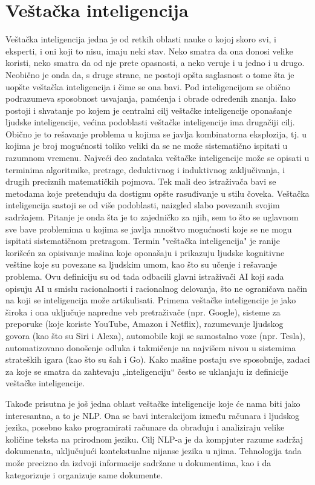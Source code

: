 \documentclass[a4paper]{article}
\begin{document}
\section{Veštačka inteligencija}
\label{Veštačka inteligencija}
Veštačka inteligencija jedna je od retkih oblasti nauke o kojoj skoro svi, i eksperti, i oni koji to nisu, imaju neki stav. Neko smatra da ona donosi velike koristi, neko smatra da od nje prete opasnosti, a neko veruje i u jedno i u drugo. Neobično je onda da, s druge strane, ne postoji opšta saglasnost o tome šta je uopšte veštačka inteligencija i čime se ona bavi. Pod inteligencijom se obično podrazumeva sposobnost usvajanja, pamćenja i obrade određenih znanja. Iako postoji i shvatanje po kojem je centralni cilj veštačke inteligencije oponašanje ljudske inteligencije, većina podoblasti veštačke inteligencije ima drugačiji cilj. Obično je to rešavanje problema u kojima se javlja kombinatorna eksplozija, tj. u kojima je broj mogućnosti toliko veliki da se ne može sistematično ispitati u razumnom vremenu. Najveći deo zadataka veštačke inteligencije može se opisati u terminima algoritmike, pretrage, deduktivnog i induktivnog zaključivanja, i drugih preciznih matematičkih pojmova. Tek mali deo istraživača bavi se metodama koje pretenduju da dostignu opšte rasuđivanje u stilu čoveka. Veštačka inteligencija sastoji se od više podoblasti, naizgled slabo povezanih svojim sadržajem. Pitanje je onda šta je to zajedničko za njih, sem to što se uglavnom sve bave problemima u kojima se javlja mnoštvo mogućnosti koje se ne mogu ispitati sistematičnom pretragom. Termin "veštačka inteligencija" je ranije korišcén za opisivanje mašina koje oponašaju i prikazuju ljudske kognitivne veštine koje su povezane sa ljudskim umom, kao što su učenje i rešavanje problema. Ovu definiciju su od tada odbacili glavni istraživači AI koji sada opisuju AI u smislu racionalnosti i racionalnog delovanja, što ne ograničava način na koji se inteligencija može artikulisati.
\newpage
Primena veštačke inteligencije je jako široka i ona uključuje napredne veb pretraživače (npr. Google), sisteme za preporuke (koje koriste YouTube, Amazon i Netflix), razumevanje ljudskog govora (kao što su Siri i Alexa), automobile koji se samostalno voze (npr. Tesla), automatizovano donošenje odluka i takmičenje na najvišem nivou u sistemima strateških igara (kao što su šah i Go). Kako mašine postaju sve sposobnije, zadaci za koje se smatra da zahtevaju „inteligenciju“ često se uklanjaju iz definicije veštačke inteligencije.

Takođe prisutna je još jedna oblast veštačke inteligencije koje će nama biti jako interesantna, a to je NLP. Ona se bavi interakcijom između računara i ljudskog jezika, posebno kako programirati računare da obrađuju i analiziraju velike količine teksta na prirodnom jeziku. Cilj NLP-a je da kompjuter razume sadržaj dokumenata, uključujući kontekstualne nijanse jezika u njima. Tehnologija tada može precizno da izdvoji informacije  sadržane u dokumentima, kao i da kategorizuje i organizuje same dokumente\cite{2}.
\end{document}
